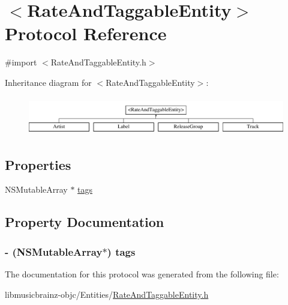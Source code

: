 \hypertarget{protocol_rate_and_taggable_entity-p}{\section{$<$Rate\-And\-Taggable\-Entity$>$ Protocol Reference}
\label{protocol_rate_and_taggable_entity-p}
}


{\ttfamily \#import $<$Rate\-And\-Taggable\-Entity.\-h$>$}

Inheritance diagram for $<$Rate\-And\-Taggable\-Entity$>$\-:\begin{figure}[H]
\begin{center}
\leavevmode
\includegraphics[height=1.696970cm]{protocol_rate_and_taggable_entity-p}
\end{center}
\end{figure}
\subsection*{Properties}
\begin{DoxyCompactItemize}
\item 
N\-S\-Mutable\-Array $\ast$ \hyperlink{protocol_rate_and_taggable_entity-p_abf6e06264da9f69a0e638d5391a70da6}{tags}
\end{DoxyCompactItemize}


\subsection{Property Documentation}
\hypertarget{protocol_rate_and_taggable_entity-p_abf6e06264da9f69a0e638d5391a70da6}{
\subsubsection[{tags}]{\setlength{\rightskip}{0pt plus 5cm}-\/ (N\-S\-Mutable\-Array$\ast$) {\bf tags}}}\label{protocol_rate_and_taggable_entity-p_abf6e06264da9f69a0e638d5391a70da6}


The documentation for this protocol was generated from the following file\-:\begin{DoxyCompactItemize}
\item 
libmusicbrainz-\/objc/\-Entities/\hyperlink{_rate_and_taggable_entity_8h}{Rate\-And\-Taggable\-Entity.\-h}\end{DoxyCompactItemize}
